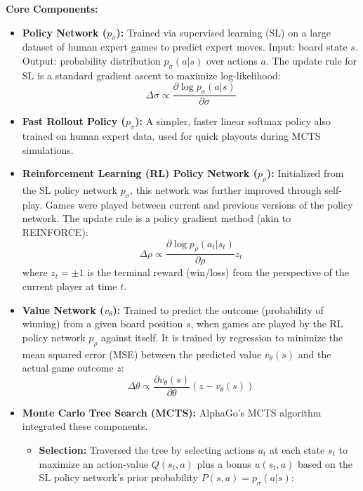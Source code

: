\documentclass[11pt,a4paper]{article}
\begin{document}
\textbf{Core Components:}
\begin{itemize}
    \item \textbf{Policy Network ($p_{\sigma}$):} Trained via supervised learning (SL) on a large dataset of human expert games to predict expert moves. Input: board state $s$. Output: probability distribution $p_{\sigma}(a|s)$ over actions $a$. The update rule for SL is a standard gradient ascent to maximize log-likelihood:
    \begin{equation}
        \Delta \sigma \propto \frac{\partial \log p_{\sigma}(a|s)}{\partial \sigma}
    \end{equation}
    \item \textbf{Fast Rollout Policy ($p_{\pi}$):} A simpler, faster linear softmax policy also trained on human expert data, used for quick playouts during MCTS simulations.
    \item \textbf{Reinforcement Learning (RL) Policy Network ($p_{\rho}$):} Initialized from the SL policy network $p_{\sigma}$, this network was further improved through self-play. Games were played between current and previous versions of the policy network. The update rule is a policy gradient method (akin to REINFORCE):
    \begin{equation}
        \Delta \rho \propto \frac{\partial \log p_{\rho}(a_t|s_t)}{\partial \rho} z_t
    \end{equation}
    where $z_t = \pm 1$ is the terminal reward (win/loss) from the perspective of the current player at time $t$.
    \item \textbf{Value Network ($v_{\theta}$):} Trained to predict the outcome (probability of winning) from a given board position $s$, when games are played by the RL policy network $p_{\rho}$ against itself. It is trained by regression to minimize the mean squared error (MSE) between the predicted value $v_{\theta}(s)$ and the actual game outcome $z$:
    \begin{equation}
        \Delta \theta \propto \frac{\partial v_{\theta}(s)}{\partial \theta} (z - v_{\theta}(s))
    \end{equation}
    \item \textbf{Monte Carlo Tree Search (MCTS):} AlphaGo's MCTS algorithm integrated these components.
    \begin{itemize}
        \item \textbf{Selection:} Traversed the tree by selecting actions $a_t$ at each state $s_t$ to maximize an action-value $Q(s_t, a)$ plus a bonus $u(s_t, a)$ based on the SL policy network's prior probability $P(s,a) = p_{\sigma}(a|s)$:

\end{itemize}
\end{itemize}
\end{document}
